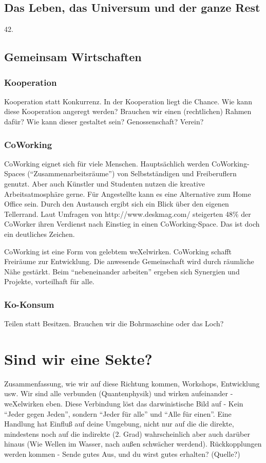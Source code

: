 
    \subsection{Das Leben, das Universum und der ganze Rest}
42.
    \subsection{Gemeinsam Wirtschaften}
      \subsubsection{Kooperation}
Kooperation statt Konkurrenz.
%
In der Kooperation liegt die Chance.
%
Wie kann diese Kooperation angeregt werden?
%
Brauchen wir einen (rechtlichen) Rahmen dafür?
%
Wie kann dieser gestaltet sein? Genossenschaft? Verein?
      \subsubsection{CoWorking}
CoWorking eignet sich für viele Menschen.
%
Hauptsächlich werden CoWorking-Spaces ("`Zusammenarbeitsräume"') von Selbstständigen und Freiberuflern genutzt.
%
Aber auch Künstler und Studenten nutzen die kreative Arbeitsatmosphäre gerne.
%
Für Angestellte kann es eine Alternative zum Home Office sein.
%
Durch den Austausch ergibt sich ein Blick über den eigenen Tellerrand.
%
Laut Umfragen von http://www.deskmag.com/ steigerten 48\% der CoWorker ihren Verdienst nach Einstieg in einen CoWorking-Space.
%
Das ist doch ein deutliches Zeichen.



CoWorking ist eine Form von gelebtem weXelwirken.
%
CoWorking schafft Freiräume zur Entwicklung.
%
Die anwesende Gemeinschaft wird durch räumliche Nähe gestärkt.
%
Beim "`nebeneinander arbeiten"' ergeben sich Synergien und Projekte, vorteilhaft für alle.
      \subsubsection{Ko-Konsum}
Teilen statt Besitzen.
%
Brauchen wir die Bohrmaschine oder das Loch?



















 \section{Sind wir eine Sekte?}
Zusammenfassung, wie wir auf diese Richtung kommen, Workshops, Entwicklung usw.
%
Wir sind alle verbunden (Quantenphysik) und wirken aufeinander - weXelwirken eben.
%
Diese Verbindung löst das darwinistische Bild auf - Kein "`Jeder gegen Jeden"', sondern "`Jeder für alle"' und "`Alle für einen"'.
%
Eine Handlung hat Einfluß auf deine Umgebung, nicht nur auf die die direkte, mindestens noch auf die indirekte (2. Grad) wahrscheinlich aber auch darüber hinaus (Wie Wellen im Wasser, nach außen schwächer werdend).
%
Rückkopplungen werden kommen - Sende gutes Aus, und du wirst gutes erhalten? (Quelle?)
